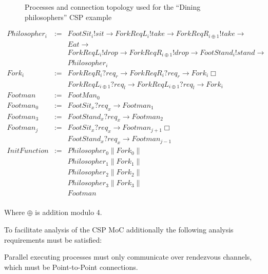 \begin{figure}[h]
\centering

\caption{Processes and connection topology used for the ``Dining philosophers'' CSP example}
\label{fig:dining-philosophers}
\end{figure}

\begin{displaymath}
\begin{array}{rcl}
Philosopher_{i}    & := & FootSit_{i}!sit \to ForkReqL_{i}!take \to ForkReqR_{i\oplus1}!take \to \\
		   &    & Eat \to \\
		   &    & ForkReqL_{i}!drop \to ForkReqR_{i\oplus1}!drop \to FootStand_{i}!stand \to \\
		   &	& Philosopher_{i} \\
Fork_{i}	   & := & ForkReqR_{i}?req_{r} \to ForkReqR_{i}?req_{r} \to Fork_{i} \Box \\
		   &    & ForkReqL_{i\oplus1}?req_{l} \to ForkReqL_{i\oplus1}?req_{l} \to Fork_{i} \\
Footman		   & := & FootMan_{0} \\
Footman_{0}	   & := & FootSit_{x}?req_{x} \to Footman_{1} \\
Footman_{3}	   & := & FootStand_{x}?req_{x} \to Footman_{2} \\
Footman_{j}	   & := & FootSit_{x}?req_{x} \to Footman_{j+1} \Box \\
		   &    & FootStand_{x}?req_{x} \to Footman_{j-1} \\
InitFunction       & := & Philosopher_{0} \| Fork_{0} \| \\
		   &    & Philosopher_{1} \| Fork_{1} \| \\
		   &    & Philosopher_{2} \| Fork_{2} \| \\
		   &    & Philosopher_{3} \| Fork_{3} \| \\
		   &    & Footman \\
\end{array}
\end{displaymath}

Where $\oplus$ is addition modulo 4.

To facilitate analysis of the CSP MoC additionally the following
analysis requirements must be satisfied:
\begin{requirement}\label{requirement-csp-communication}
  Parallel executing processes must only communicate over rendezvous channels,
  which must be Point-to-Point connections.
\end{requirement}

